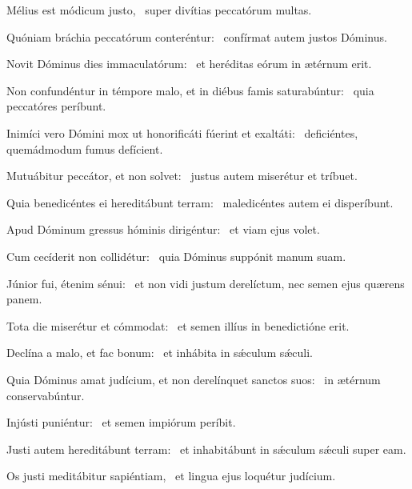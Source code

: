 \item Mélius est módicum justo,~\psstar{} super divítias peccatórum multas.

\item Quóniam bráchia peccatórum conteréntur:~\psstar{} confírmat autem justos Dóminus.

\item Novit Dóminus dies immaculatórum:~\psstar{} et heréditas eórum in ætérnum erit.

\item Non confundéntur in témpore malo, et in diébus famis saturabúntur:~\psstar{} quia peccatóres períbunt.

\item Inimíci vero Dómini mox ut honorificáti fúerint et exaltáti:~\psstar{} deficiéntes, quemádmodum fumus defícient.

\item Mutuábitur peccátor, et non solvet:~\psstar{} justus autem miserétur et tríbuet.

\item Quia benedicéntes ei hereditábunt terram:~\psstar{} maledicéntes autem ei disperíbunt.

\item Apud Dóminum gressus hóminis dirigéntur:~\psstar{} et viam ejus volet.

\item Cum cecíderit non collidétur:~\psstar{} quia Dóminus suppónit manum suam.

\item Júnior fui, étenim sénui:~\psstar{} et non vidi justum derelíctum, nec semen ejus quærens panem.

\item Tota die miserétur et cómmodat:~\psstar{} et semen illíus in benedictióne erit.

\item Declína a malo, et fac bonum:~\psstar{} et inhábita in sǽculum sǽculi.

\item Quia Dóminus amat judícium, et non derelínquet sanctos suos:~\psstar{} in ætérnum conservabúntur.

\item Injústi puniéntur:~\psstar{} et semen impiórum períbit.

\item Justi autem hereditábunt terram:~\psstar{} et inhabitábunt in sǽculum sǽculi super eam.

\item Os justi meditábitur sapiéntiam,~\psstar{} et lingua ejus loquétur judícium.

